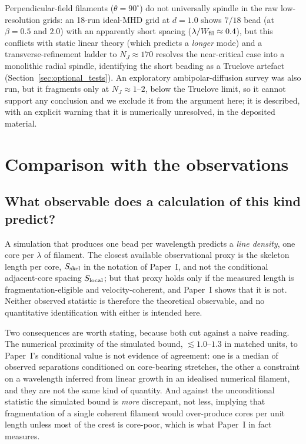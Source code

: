 \documentclass[usenatbib,twoside,twocolumn]{mnras}
\begin{document}
Perpendicular-field filaments ($\theta=90^\circ$) do not universally spindle in the raw low-resolution grids: an 18-run ideal-MHD grid at $d=1.0$ shows $7/18$ bead (at $\beta=0.5$ and $2.0$) with an apparently short spacing ($\lambda/W_{\rm fil}\approx0.4$), but this conflicts with static linear theory (which predicts a \emph{longer} mode) and a transverse-refinement ladder to $N_J\approx170$ resolves the near-critical case into a monolithic radial spindle, identifying the short beading as a Truelove artefact (Section~\ref{sec:optional_tests}). An exploratory ambipolar-diffusion survey was also run, but it fragments only at $N_J\approx1$--$2$, below the Truelove limit, so it cannot support any conclusion and we exclude it from the argument here; it is described, with an explicit warning that it is numerically unresolved, in the deposited material.


\section{Comparison with the observations}
\label{sec:comparison}

\subsection{What observable does a calculation of this kind predict?}


A simulation that produces one bead per wavelength predicts a \emph{line density}, one core per $\lambda$ of filament. The closest available observational proxy is the skeleton length per core, $S_{\rm skel}$ in the notation of Paper~I, and not the conditional adjacent-core spacing $S_{\rm local}$; but that proxy holds only if the measured length is fragmentation-eligible and velocity-coherent, and Paper~I shows that it is not. Neither observed statistic is therefore the theoretical observable, and no quantitative identification with either is intended here.

Two consequences are worth stating, because both cut against a naive reading. The numerical proximity of the simulated bound, $\lesssim1.0$--$1.3$ in matched units, to Paper~I's conditional value is not evidence of agreement: one is a median of observed separations conditioned on core-bearing stretches, the other a constraint on a wavelength inferred from linear growth in an idealised numerical filament, and they are not the same kind of quantity. And against the unconditional statistic the simulated bound is \emph{more} discrepant, not less, implying that fragmentation of a single coherent filament would over-produce cores per unit length unless most of the crest is core-poor, which is what Paper~I in fact measures.
\end{document}
